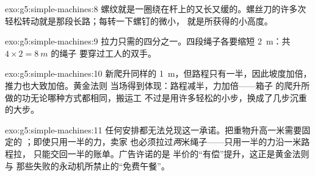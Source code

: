 \begin{solution}{exo:g5:simple-machines:8}
螺纹就是一圈绕在杆上的又长又缓的。螺丝刀的许多次
轻松转动就是那段长路；每转一下螺钉的微小，
就是所获得的小高度。
\end{solution}

\begin{solution}{exo:g5:simple-machines:9}
拉力只需的四分之一。四段绳子各要缩短
\qty{2}{m}：共 $4 \times 2 = \qty{8}{m}$ 的绳子
要穿过工人的双手。
\end{solution}

\begin{solution}{exo:g5:simple-machines:10}
新爬升同样的 \qty{1}{m}，但路程只有一半，因此坡度加倍，
推力也大致加倍。黄金法则
当场得到体现：路程减半，力加倍——箱子
的爬升所做的功无论哪种方式都相同，搬运工
不过是用许多轻松的小步，换成了几步沉重的大步。
\end{solution}

\begin{solution}{exo:g5:simple-machines:11}
任何安排都无法兑现这一承诺。把重物升高一米需要固定的
；即使只用一半的力，卖家
也必须拉过\emph{两}米绳子——只用一半的力沿一米路程拉，
只能交回一半的账单。广告许诺的是
半价的“有偿”提升，这正是黄金法则与
那些失败的永动机所禁止的“免费午餐”。
\end{solution}
